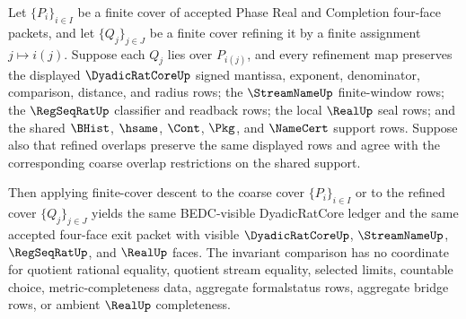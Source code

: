 \begin{theorem}
\label{thm:dyadicratcore-l10-exit-ledger-finite-cover-refinement-invariance}
Let $\{P_i\}_{i\in I}$ be a finite cover of accepted Phase Real and Completion four-face packets, and let $\{Q_j\}_{j\in J}$ be a finite cover refining it by a finite assignment $j \mapsto i(j)$. Suppose each $Q_j$ lies over $P_{i(j)}$, and every refinement map preserves the displayed $\DyadicRatCoreUp$ signed mantissa, exponent, denominator, comparison, distance, and radius rows; the $\StreamNameUp$ finite-window rows; the $\RegSeqRatUp$ classifier and readback rows; the local $\RealUp$ seal rows; and the shared $\BHist$, $\hsame$, $\Cont$, $\Pkg$, and $\NameCert$ support rows. Suppose also that refined overlaps preserve the same displayed rows and agree with the corresponding coarse overlap restrictions on the shared support.

Then applying finite-cover descent to the coarse cover $\{P_i\}_{i\in I}$ or to the refined cover $\{Q_j\}_{j\in J}$ yields the same BEDC-visible DyadicRatCore ledger and the same accepted four-face exit packet with visible $\DyadicRatCoreUp$, $\StreamNameUp$, $\RegSeqRatUp$, and $\RealUp$ faces. The invariant comparison has no coordinate for quotient rational equality, quotient stream equality, selected limits, countable choice, metric-completeness data, aggregate formalstatus rows, aggregate bridge rows, or ambient $\RealUp$ completeness.
\end{theorem}
